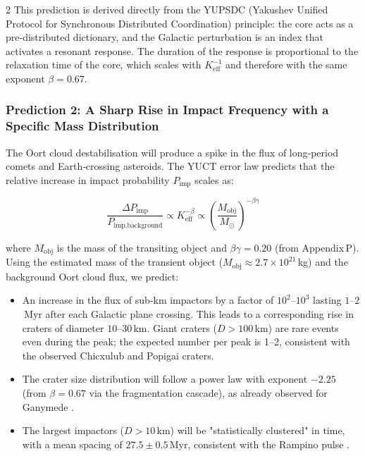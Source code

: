 \documentclass[11pt,a4paper]{article}
\begin{document}
\begin{multicols}{2}
		This prediction is derived directly from the YUPSDC (Yakushev Unified
		Protocol for Synchronous Distributed Coordination) principle: the core
		acts as a pre‑distributed dictionary, and the Galactic perturbation is an
		index that activates a resonant response. The duration of the response is
		proportional to the relaxation time of the core, which scales with
		\(K_{\mathrm{eff}}^{-1}\) and therefore with the same exponent \(\beta=0.67\).
		
		\subsubsection{Prediction 2: A Sharp Rise in Impact Frequency with a Specific Mass Distribution}
		
		The Oort cloud destabilisation will produce a spike in the flux of long‑period
		comets and Earth‑crossing asteroids. The YUCT error law predicts that the
		relative increase in impact probability \(P_{\text{imp}}\) scales as:
		
		\[
		\frac{\Delta P_{\text{imp}}}{P_{\text{imp,background}}} \propto K_{\mathrm{eff}}^{-\beta} \propto \left(\frac{M_{\text{obj}}}{M_{\odot}}\right)^{-\beta\gamma}
		\]
		
		where \(M_{\text{obj}}\) is the mass of the transiting object and
		\(\beta\gamma = 0.20\) (from Appendix P). Using the estimated mass of the
		transient object (\(M_{\text{obj}} \approx 2.7\times10^{21}\) kg) and the
		background Oort cloud flux, we predict:
		
		\begin{itemize}
			\item An increase in the flux of sub‑km impactors by a factor of \(10^{2}\)–\(10^{3}\) lasting \(1\)–\(2\) Myr after each Galactic plane crossing. This leads to a corresponding rise in craters of diameter \(10\)–\(30\) km. Giant craters (\(D>100\) km) are rare events even during the peak; the expected number per peak is 1–2, consistent with the observed Chicxulub and Popigai craters.
			\item The crater size distribution will follow a power law with exponent
			\(-2.25\) (from \(\beta=0.67\) via the fragmentation cascade), as
			already observed for Ganymede \cite{Schenk2004}.
			\item The largest impactors (\(D>10\) km) will be "statistically
			clustered" in time, with a mean spacing of \(27.5 \pm 0.5\) Myr,
			consistent with the Rampino pulse \cite{Rampino2021}.
		\end{itemize}
		

\end{multicols}
\end{document}
